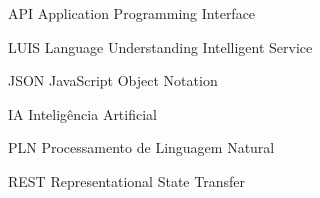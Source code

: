 \begin{siglas}
\item[API] Application Programming Interface
\item[LUIS] Language Understanding Intelligent Service
\item[JSON] JavaScript Object Notation
\item[IA] Inteligência Artificial
\item[PLN] Processamento de Linguagem Natural 
\item[REST ] Representational State Transfer
\end{siglas}
